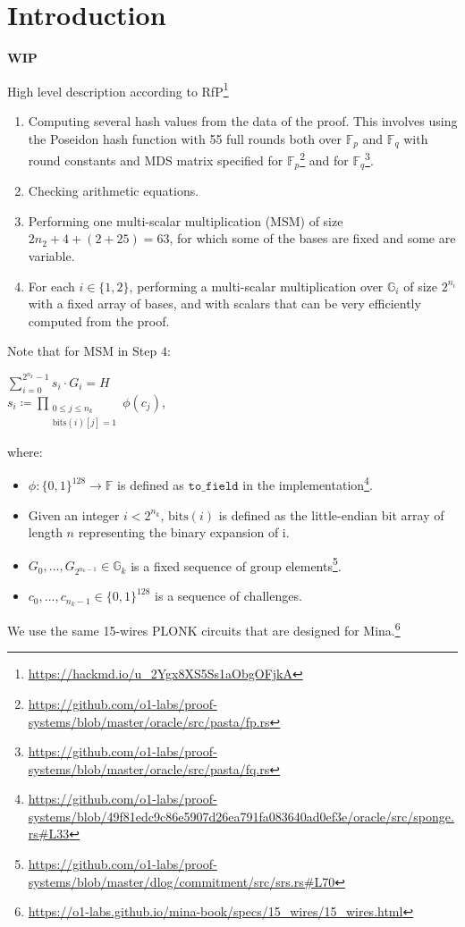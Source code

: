 \section{Introduction}
\label{section:introduction}
\textbf{WIP}

High level description according to RfP\footnote{\url{https://hackmd.io/u_2Ygx8XS5Ss1aObgOFjkA}}
\begin{enumerate}
	\item Computing several hash values from the data of the proof. 
This involves using the Poseidon hash function with 55 full rounds both over $\mathbb{F}_p$ and $\mathbb{F}_q$ 
with round constants and MDS matrix specified for $\mathbb{F}_p$\footnote{\url{https://github.com/o1-labs/proof-systems/blob/master/oracle/src/pasta/fp.rs}} 
and for $\mathbb{F}_q$\footnote{\url{https://github.com/o1-labs/proof-systems/blob/master/oracle/src/pasta/fq.rs}}.
	\item Checking arithmetic equations.
	\item Performing one multi-scalar multiplication (MSM) of size $2n_2 + 4 + (2 + 25) = 63$,
for which some of the bases are fixed and some are variable.
	\item For each $i \in \{1, 2\}$, performing a multi-scalar multiplication over $\mathbb{G}_i$ of size $2^{n_i}$
with a fixed array of bases, and with scalars that can be very efficiently computed from the proof.
\end{enumerate}

Note that for MSM in Step $4$:
\begin{center}
	$\sum\limits_{i = 0}^{2^{n_k} - 1}s_i \cdot G_i = H$ \\
	$s_i \coloneqq \prod\limits_{\substack{0 \leq j \leq n_k \\  \text{bits}(i)[j] = 1}} \phi(c_j)$,
\end{center}
where:
\begin{itemize}
	\item $\phi\colon \{0, 1\}^{128} \to \mathbb{F}$ is defined as $\texttt{to\_field}$ in the implementation\footnote{
\url{https://github.com/o1-labs/proof-systems/blob/49f81edc9c86e5907d26ea791fa083640ad0ef3e/oracle/src/sponge.rs\#L33}}.
	\item Given an integer $i < 2^{n_k}$, $\text{bits}(i)$ is defined as the little-endian bit array of length $n$ representing the binary expansion of i. 
	\item $G_0, ..., G_{2^{n_k - 1}} \in \mathbb{G}_k$ is a fixed sequence of group elements\footnote{
\url{https://github.com/o1-labs/proof-systems/blob/master/dlog/commitment/src/srs.rs\#L70}}.
	\item $c_0, ..., c_{n_k -1} \in \{0, 1\}^{128}$ is a sequence of challenges. 
\end{itemize}

We use the same 15-wires PLONK circuits that are designed for Mina.\footnote{\url{https://o1-labs.github.io/mina-book/specs/15_wires/15_wires.html}}